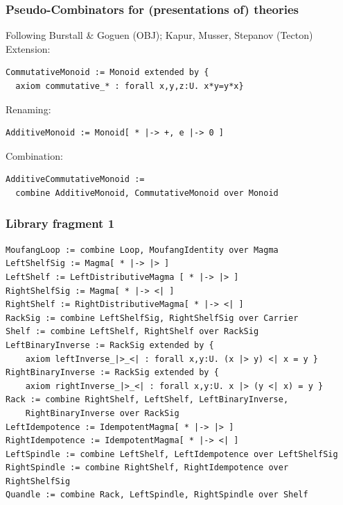 \documentclass{beamer}
\begin{document}
\begin{frame}[t,fragile]
\frametitle{Pseudo-Combinators for (presentations of) theories}
Following Burstall \& Goguen (OBJ); Kapur, Musser, Stepanov (Tecton)\\ \vspace*{5mm}
Extension:
\begin{lstlisting}
CommutativeMonoid := Monoid extended by {
  axiom commutative_* : forall x,y,z:U. x*y=y*x}
\end{lstlisting}
\pause
Renaming:
\begin{lstlisting}
AdditiveMonoid := Monoid[ * |-> +, e |-> 0 ]
\end{lstlisting}
\pause
Combination:
\begin{lstlisting}
AdditiveCommutativeMonoid := 
  combine AdditiveMonoid, CommutativeMonoid over Monoid
\end{lstlisting}
\end{frame}

\lstset{language=mathscheme,basicstyle=\scriptsize}
\begin{frame}[t,fragile]
\frametitle{Library fragment 1}
\begin{lstlisting}
MoufangLoop := combine Loop, MoufangIdentity over Magma
LeftShelfSig := Magma[ * |-> |> ]
LeftShelf := LeftDistributiveMagma [ * |-> |> ]
RightShelfSig := Magma[ * |-> <| ]
RightShelf := RightDistributiveMagma[ * |-> <| ]
RackSig := combine LeftShelfSig, RightShelfSig over Carrier
Shelf := combine LeftShelf, RightShelf over RackSig
LeftBinaryInverse := RackSig extended by {
    axiom leftInverse_|>_<| : forall x,y:U. (x |> y) <| x = y }
RightBinaryInverse := RackSig extended by {
    axiom rightInverse_|>_<| : forall x,y:U. x |> (y <| x) = y }
Rack := combine RightShelf, LeftShelf, LeftBinaryInverse, 
    RightBinaryInverse over RackSig
LeftIdempotence := IdempotentMagma[ * |-> |> ]
RightIdempotence := IdempotentMagma[ * |-> <| ]
LeftSpindle := combine LeftShelf, LeftIdempotence over LeftShelfSig
RightSpindle := combine RightShelf, RightIdempotence over RightShelfSig
Quandle := combine Rack, LeftSpindle, RightSpindle over Shelf
\end{lstlisting}
\end{frame}
\end{document}
